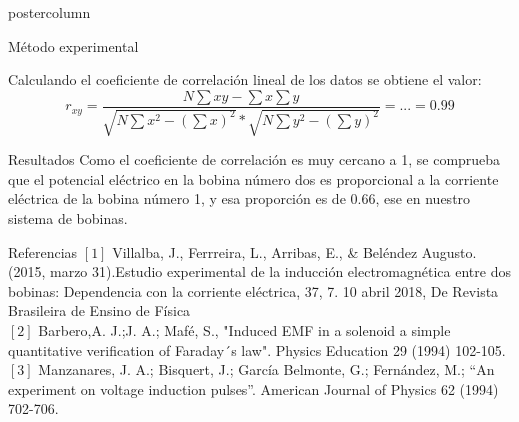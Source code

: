 \documentclass{beamer}
\begin{document}
\begin{columns}
\begin{column}{.50\textwidth}
\begin{beamercolorbox}[center]{postercolumn}
\begin{minipage}{.98\textwidth}
{\begin{myblock}{Método experimental}
\begin{center}
\end{center}
Calculando el coeficiente de correlación lineal de los datos se obtiene el valor:
\begin{equation*}
r_{xy}= \frac{N\sum xy - \sum x \sum y}{\sqrt{N\sum x^2 - (\sum x)^2 }*\sqrt{N\sum y^2 -(\sum{y})^2}}=...=0.99
\end{equation*}
\end{myblock}
\begin{myblock}{Resultados}
Como el coeficiente de correlación es muy cercano a 1, se comprueba que el potencial eléctrico en la bobina número dos es proporcional a la corriente eléctrica de la bobina número 1, y esa proporción es de 0.66, ese en nuestro sistema de bobinas.
\end{myblock}
\begin{myblock}{Referencias}
\small
$[1]$ Villalba, J., Ferrreira, L., Arribas, E., \& Beléndez Augusto. (2015, marzo 31).Estudio experimental de la inducción 	electromagnética entre dos bobinas: Dependencia con la corriente eléctrica, 37, 7. 10 abril 2018, De Revista 			Brasileira de Ensino de Física\\
$[2]$ Barbero,A. J.;J. A.; Mafé, S., "Induced EMF in a solenoid a simple quantitative verification of Faraday´s law". Physics Education 29 (1994) 102-105.\\
$[3]$ Manzanares, J. A.; Bisquert, J.; García Belmonte, G.; Fernández, M.; “An
experiment on voltage induction pulses”. American Journal of Physics 62
(1994) 702-706.
\end{myblock}
}
\end{minipage}
\end{beamercolorbox}
\end{column}
\end{columns}
\end{document}

